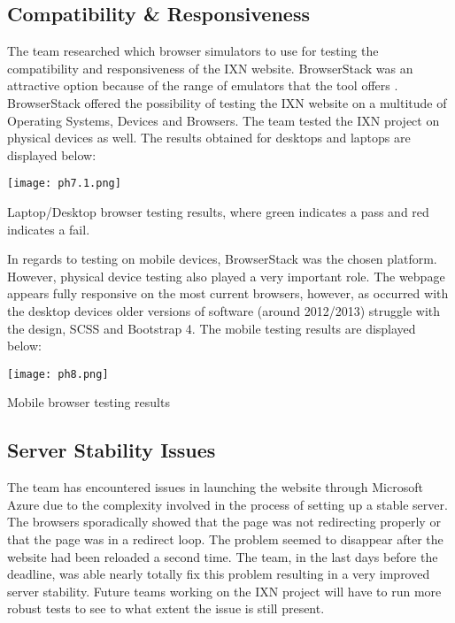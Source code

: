 \documentclass[fontsize=11pt]{extarticle}
\numberwithin{figure}{section} %
\numberwithin{table}{section}%
\begin{document}
\hypertarget{compatibility-responsiveness}{%
\subsection{Compatibility \&
Responsiveness}\label{compatibility-responsiveness}}

The team researched which browser simulators to use for testing the
compatibility and responsiveness of the IXN website. BrowserStack was an
attractive option because of the range of emulators that the tool offers
\cite{g6}. BrowserStack offered the possibility of testing the IXN
website on a multitude of Operating Systems, Devices and Browsers. The
team tested the IXN project on physical devices as well. The results
obtained for desktops and laptops are displayed below:

\begin{table}[H]
      \centering
      \texttt{[image: ph7.1.png]}
      \caption{Laptop/Desktop browser testing results, where green indicates a pass and red indicates a fail.}
 \end{table}

In regards to testing on mobile devices, BrowserStack was the chosen
platform. However, physical device testing also played a very important
role. The webpage appears fully responsive on the most current browsers,
however, as occurred with the desktop devices older versions of software
(around 2012/2013) struggle with the design, SCSS and Bootstrap 4. The
mobile testing results are displayed below:

\begin{table}[H]
      \centering
      \texttt{[image: ph8.png]}
      \caption{Mobile browser testing results}
 \end{table}

\hypertarget{server-stability-issues}{%
\subsection{Server Stability Issues}\label{server-stability-issues}}

The team has encountered issues in launching the website through
Microsoft Azure due to the complexity involved in the process of setting
up a stable server. The browsers sporadically showed that the page was
not redirecting properly or that the page was in a redirect loop. The
problem seemed to disappear after the website had been reloaded a second
time. The team, in the last days before the deadline, was able nearly
totally fix this problem resulting in a very improved server stability.
Future teams working on the IXN project will have to run more robust
tests to see to what extent the issue is still present.
\end{document}
